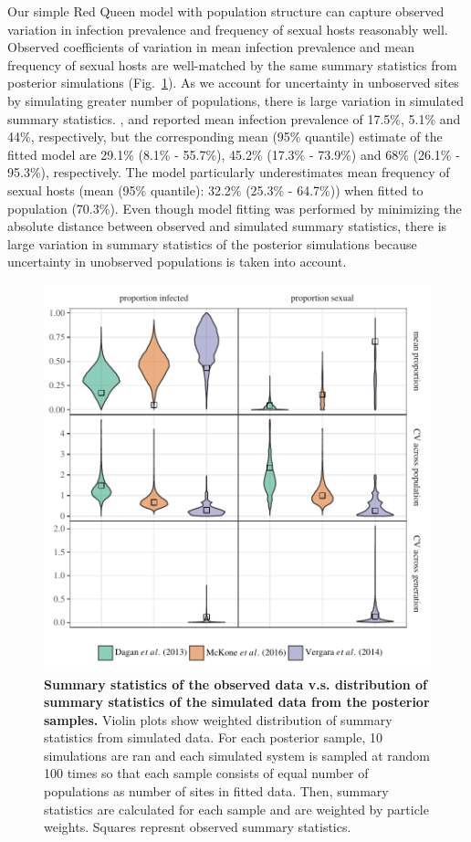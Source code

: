 \documentclass{article}\usepackage[]{graphicx}\usepackage[]{color}
\newcommand{\fref}[1]{Fig.~\ref{fig:#1}}
\begin{document}
Our simple Red Queen model with population structure can capture observed variation in infection prevalence and frequency of sexual hosts reasonably well.
Observed coefficients of variation in mean infection prevalence and mean frequency of sexual hosts are well-matched by the same summary statistics from posterior simulations (\fref{smcsumm}).
As we account for uncertainty in unboserved sites by simulating greater number of populations, there is large variation in simulated summary statistics.
\cite{dagan2013clonal}, \cite{mckone2016fine} and \cite{vergara2014infection} reported mean infection prevalence of 17.5\%, 5.1\% and 44\%, respectively, but the corresponding mean (95\% quantile) estimate of the fitted model are 29.1\% (8.1\% - 55.7\%), 45.2\% (17.3\% - 73.9\%) and 68\% (26.1\% - 95.3\%), respectively.
The model particularly underestimates mean frequency of sexual hosts (mean (95\% quantile): 32.2\% (25.3\% - 64.7\%)) when fitted to \cite{vergara2014infection} population (70.3\%).
Even though model fitting was performed by minimizing the absolute distance between observed and simulated summary statistics, there is large variation in summary statistics of the posterior simulations because uncertainty in unobserved populations is taken into account.

\begin{figure}[!ht]
\includegraphics[width=\textwidth]{../fig/smc_summary.pdf}
\caption{{\bf Summary statistics of the observed data v.s. distribution of summary statistics of the simulated data from the posterior samples.}
Violin plots show weighted distribution of summary statistics from simulated data. For each posterior sample, 10 simulations are ran and each simulated system is sampled at random 100 times so that each sample consists of equal number of populations as number of sites in fitted data. Then, summary statistics are calculated for each sample and are weighted by particle weights. Squares represnt observed summary statistics.
}
\label{fig:smcsumm}
\end{figure}
\end{document}
